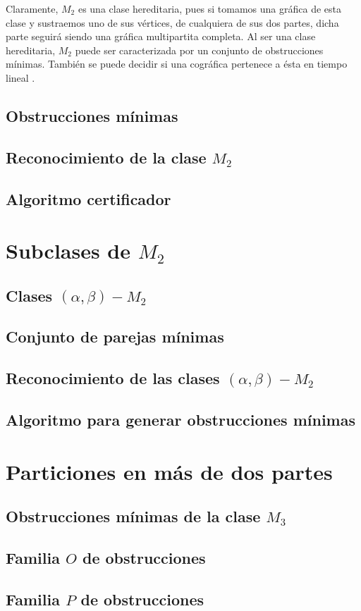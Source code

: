     Claramente, $M_2$ es una clase hereditaria, pues si tomamos una gráfica de esta clase y sustraemos uno de sus vértices, de cualquiera de sus dos partes, dicha parte seguirá siendo una gráfica multipartita completa. Al ser una clase hereditaria, $M_2$ puede ser caracterizada por un conjunto de obstrucciones mínimas. También se puede decidir si una cográfica pertenece a ésta en tiempo lineal \cite{unknown}.
    
    \subsection{Obstrucciones mínimas}
        
        
    \subsection{Reconocimiento de la clase $M_2$}
        
    
    \subsection{Algoritmo certificador}
        

\section{Subclases de $M_2$}
    
    \subsection{Clases $(\alpha, \beta)-M_2$}
    
    \subsection{Conjunto de parejas mínimas}
    
    \subsection{Reconocimiento de las clases $(\alpha, \beta)-M_2$}
    
    \subsection{Algoritmo para generar obstrucciones mínimas}

\section{Particiones en más de dos partes}

    \subsection{Obstrucciones mínimas de la clase $M_3$}
        
        
    \subsection{Familia $O$ de obstrucciones}
    
    \subsection{Familia $P$ de obstrucciones}
    